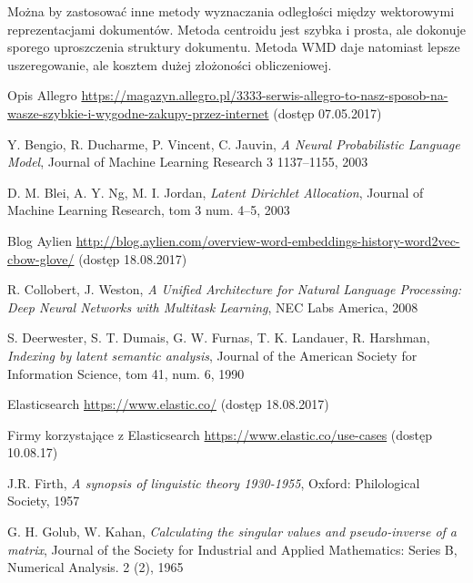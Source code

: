 \documentclass[pl]{minipw} %
\begin{document}
Można by zastosować inne metody wyznaczania odległości między wektorowymi reprezentacjami dokumentów. Metoda centroidu jest szybka i prosta, ale dokonuje sporego uproszczenia struktury dokumentu. Metoda WMD daje natomiast lepsze uszeregowanie, ale kosztem dużej złożoności obliczeniowej.

\begin{thebibliography}{30}
		Opis Allegro
		\url{https://magazyn.allegro.pl/3333-serwis-allegro-to-nasz-sposob-na-wasze-szybkie-i-wygodne-zakupy-przez-internet}
		(dostęp 07.05.2017)
	
		Y. Bengio, R. Ducharme, P. Vincent, C. Jauvin,
		\emph{A Neural Probabilistic Language Model},
		Journal of Machine Learning Research 3 1137–1155,
		2003
	
		D. M. Blei, A. Y. Ng, M. I. Jordan,
		\emph{Latent Dirichlet Allocation},
		Journal of Machine Learning Research, tom 3 num. 4–5,
		2003
		
		Blog Aylien
		\url{http://blog.aylien.com/overview-word-embeddings-history-word2vec-cbow-glove/}
		(dostęp 18.08.2017)
	
		R. Collobert, J. Weston,
		\emph{A Unified Architecture for Natural Language Processing: Deep Neural Networks with Multitask Learning},
		NEC Labs America,
		2008
	
		S. Deerwester, S. T. Dumais, G. W. Furnas, T. K. Landauer, R. Harshman,
		\emph{Indexing by latent semantic analysis},
		Journal of the American Society for Information Science, tom 41, num. 6,
		1990
	
		Elasticsearch
		\url{https://www.elastic.co/}
		(dostęp 18.08.2017)
	
		Firmy korzystające z Elasticsearch
		\url{https://www.elastic.co/use-cases}
		(dostęp 10.08.17)
	
		J.R. Firth,
		\emph{A synopsis of linguistic theory 1930-1955},
		Oxford: Philological Society,
		1957
	
		G. H. Golub, W. Kahan,
		\emph{Calculating the singular values and pseudo-inverse of a matrix},
		Journal of the Society for Industrial and Applied Mathematics: Series B, Numerical Analysis. 2 (2),
		1965
	

\end{thebibliography}
\end{document}
